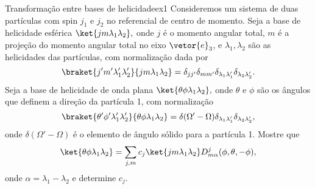 \begin{exercício}{Transformação entre bases de helicidade}{ex1}
   Consideremos um sistema de duas partículas com spin \(j_1\) e \(j_2\) no referencial de centro de momento. Seja a base de helicidade esférica \(\ket{jm \lambda_1 \lambda_2},\) onde \(j\) é o momento angular total, \(m\) é a projeção do momento angular total no eixo \(\vetor{e}_3\), e \(\lambda_1, \lambda_2\) são as helicidades das partículas, com normalização dada por
   \begin{equation*}
      \braket{j'm'\lambda_1'\lambda_2'}{jm\lambda_1 \lambda_2} = \delta_{jj'} \delta_{mm'} \delta_{\lambda_1 \lambda_1'} \delta_{\lambda_2 \lambda_2'}.
   \end{equation*}
   Seja a base de helicidade de onda plana \(\ket{\theta \phi \lambda_1 \lambda_2},\) onde \(\theta\) e \(\phi\) são os ângulos que definem a direção da partícula 1, com normalização
   \begin{equation*}
      \braket{\theta' \phi' \lambda_1' \lambda_2'}{\theta \phi \lambda_1 \lambda_2} = \delta(\Omega' - \Omega) \delta_{\lambda_1\lambda_1'} \delta_{\lambda_2 \lambda_2'},
   \end{equation*}
   onde \(\delta(\Omega' - \Omega)\) é o elemento de ângulo sólido para a partícula 1. Mostre que
   \begin{equation*}
      \ket{\theta\phi \lambda_1 \lambda_2} = \sum_{j, m} c_j \ket{jm \lambda_1 \lambda_2} D^j_{m \alpha}(\phi, \theta, -\phi),
   \end{equation*}
   onde \(\alpha = \lambda_1 - \lambda_2\) e determine \(c_j\).
\end{exercício}
